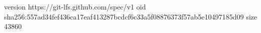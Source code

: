 version https://git-lfs.github.com/spec/v1
oid sha256:557ad34fef436ca17eaf413287bcdcf6c33a5f08876373f57ab5e10497185d09
size 43860
